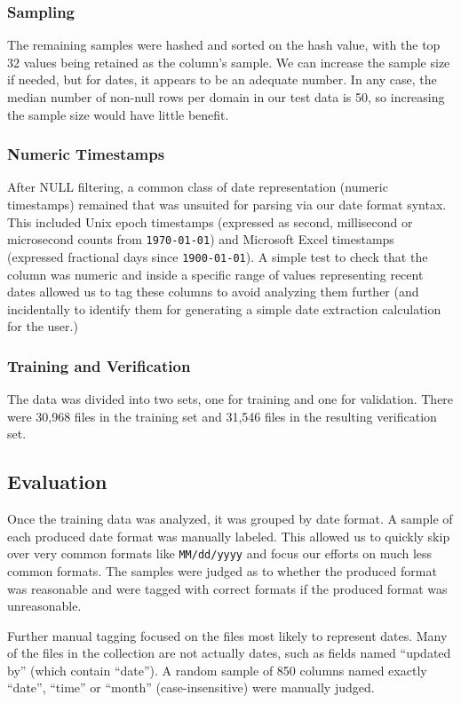 \subsubsection{Sampling}
The remaining samples were hashed and sorted on the hash value, with the top 32 values being retained as the column's sample. We can increase the sample size if needed, but for dates, it appears to be an adequate number. In any case, the median number of non-null rows per domain in our test data is 50, so increasing the sample size would have little benefit.

\subsubsection{Numeric Timestamps}
After NULL filtering, a common class of date representation (numeric timestamps) remained that was unsuited for parsing via our date format syntax. This included Unix epoch timestamps (expressed as second, millisecond or microsecond counts from \texttt{1970-01-01}) and Microsoft Excel timestamps (expressed fractional days since \texttt{1900-01-01}). A simple test to check that the column was numeric and inside a specific range of values representing recent dates allowed us to tag these columns to avoid analyzing them further (and incidentally to identify them for generating a simple date extraction calculation for the user.)

\subsubsection{Training and Verification}

The data was divided into two sets, one for training and one for validation. There were 30,968 files in the training set and 31,546 files in the resulting verification set.

\subsection{Evaluation}
Once the training data was analyzed, it was grouped by date format. A sample of each produced date format was manually labeled. This allowed us to quickly skip over very common formats like \texttt{MM/dd/yyyy} and focus our efforts on much less common formats. The samples were judged as to whether the produced format was reasonable and were tagged with correct formats if the produced format was unreasonable.

Further manual tagging focused on the files most likely to represent dates. Many of the files in the collection are not actually dates, such as fields named ``updated by'' (which contain ``date''). A random sample of 850 columns named exactly ``date'', ``time'' or ``month'' (case-insensitive) were manually judged.\\

